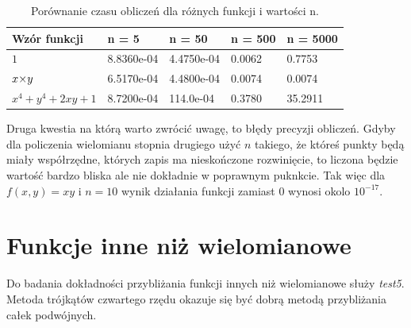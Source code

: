 \documentclass[a4paper,12pt]{article}
\newcommand{\razy}{\hspace{-0.5ex}\times\hspace{-0.5ex}} %
\begin{document}
\begin{table}[h]
\begin{center}
\begin{tabular}{lllll}
\textbf{Wzór funkcji} & \textbf{n = 5} & \textbf{n = 50} & \textbf{n = 500} & \textbf{n = 5000} \\
\hline
$1$                    &  8.8360e-04 & 4.4750e-04 & 0.0062 & 0.7753\\
$x \razy y $           &  6.5170e-04 & 4.4800e-04 & 0.0074 & 0.0074\\
$x^4 + y^4 + 2xy + 1 $ &  8.7200e-04 & 114.0e-04  & 0.3780 & 35.2911\\
\end{tabular}
\footnotesize \caption{\label{2}Porównanie czasu obliczeń dla różnych funkcji i wartości n.}
\end{center}
\end{table}
\vspace{-6mm}%
Druga kwestia na którą warto zwrócić uwagę, to błędy precyzji obliczeń. Gdyby dla policzenia wielomianu stopnia drugiego użyć $n$ takiego, że któreś punkty będą miały współrzędne, których zapis ma nieskończone rozwinięcie, to liczona będzie wartość bardzo bliska ale nie dokładnie w poprawnym puknkcie. Tak więc dla $f(x,y) = xy$ i $n=10$ wynik działania funkcji zamiast 0 wynosi okolo $10^{-17}$.

\section*{Funkcje inne niż wielomianowe}
Do badania dokładności przybliżania funkcji innych niż wielomianowe służy \emph{test5}. Metoda trójkątów czwartego rzędu okazuje się być dobrą metodą przybliżania całek podwójnych.
\end{document}
